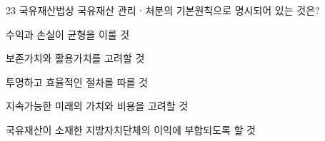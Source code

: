 \begin{question}{23}
국유재산법상 국유재산 관리ㆍ처분의 기본원칙으로 명시되어 있는 것은?
\begin{choices}
  \item 수익과 손실이 균형을 이룰 것
  \item 보존가치와 활용가치를 고려할 것
  \item 투명하고 효율적인 절차를 따를 것
  \item 지속가능한 미래의 가치와 비용을 고려할 것
  \item 국유재산이 소재한 지방자치단체의 이익에 부합되도록 할 것
\end{choices}
\end{question}
